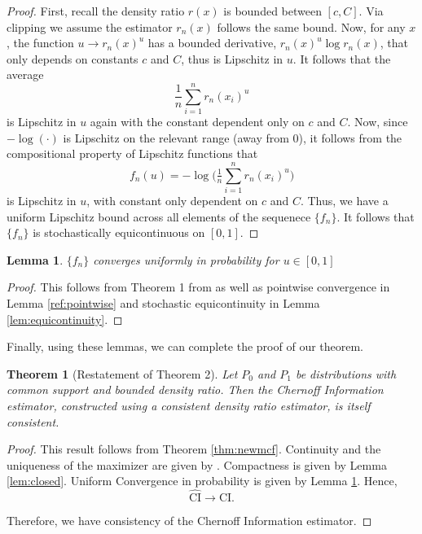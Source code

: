 \documentclass[11pt,letterpaper]{article}
\newtheorem{theorem}{Theorem}
\newtheorem{lemma}{Lemma}
\begin{document}
\begin{proof}

First, recall the density ratio $r(x)$ is bounded between $[c, C]$. Via clipping we assume the estimator $r_n(x)$ follows the same bound. Now, for any $x$, the function $u \rightarrow r_n(x)^u$ has a bounded derivative, $r_n(x)^u \log r_n(x)$, that only depends on constants $c$ and $C$, thus is Lipschitz in $u$. It follows that the average 
$$
\frac{1}{n}\sum_{i=1}^n r_n(x_i)^u
$$
is Lipschitz in $u$ again with the constant dependent only on $c$ and $C$. Now, since $-\log(\cdot)$ is Lipschitz on the relevant range (away from 0), it follows from the compositional property of Lipschitz functions that
$$
f_n(u) = -\log\Big(\tfrac{1}{n}\sum_{i=1}^n r_n(x_i)^u\Big)
$$
is Lipschitz in $u$, with constant only dependent on $c$ and $C$. Thus, we have a uniform Lipschitz bound across all elements of the sequenece $\{f_n\}$. It follows that $\{f_n\}$ is stochastically equicontinuous on $[0,1]$.
\end{proof}

\begin{lemma} \label{lem:uniformly}
    $\{f_n\}$ converges uniformly in probability for $u \in [0,1]$ 
\end{lemma}

\begin{proof}
    This follows from Theorem 1 from \citet{newey1991uniform} as well as pointwise convergence in Lemma \ref{ref:pointwise} and stochastic equicontinuity in Lemma \ref{lem:equicontinuity}.
\end{proof}
    
Finally, using these lemmas, we can complete the proof of our theorem.

\begin{theorem}[Restatement of Theorem 2] Let $P_0$ and $P_1$ be distributions with common support and bounded density ratio. Then the Chernoff Information estimator, constructed using a consistent density ratio estimator, is itself consistent.
\end{theorem}

\begin{proof}
    This result follows from Theorem \ref{thm:newmcf}. Continuity and the uniqueness of the maximizer are given by \citet{nielsen2022revisiting}. Compactness is given by Lemma \ref{lem:closed}. Uniform Convergence in probability is given by Lemma \ref{lem:uniformly}. Hence, 
    \begin{equation}
        \widehat{\text{CI}} \rightarrow \text{CI}.
    \end{equation}
    

    Therefore, we have consistency of the Chernoff Information estimator. 
\end{proof}
\end{document}
